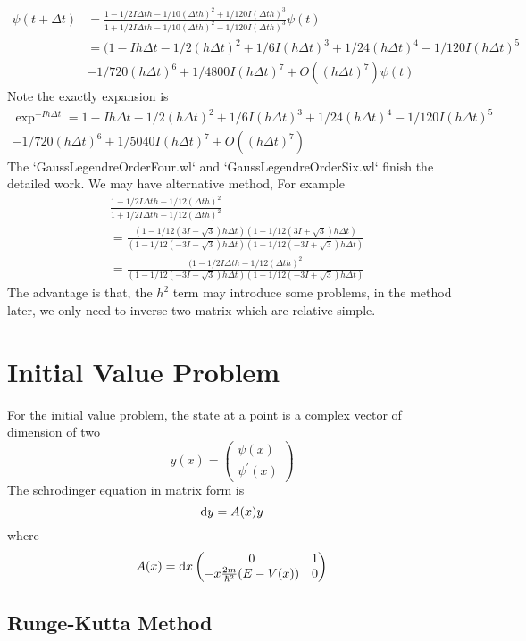 \documentclass[12pt,twoside]{article}
\def\df{{\rm d}}
\begin{document}
\begin{align*}
\psi(t + \Delta t) &= \frac{1 - 1/2 I \Delta t h - 1/10 (\Delta t h)^2 + 1/120 I (\Delta t h)^3}{ 1 + 1/2 I \Delta t h - 1/10 (\Delta t h)^2 - 1/120 I (\Delta t h)^3} \psi(t)\\
&=(1 - I h \Delta t - 1/2 (h \Delta t)^2 + 1/6 I(h \Delta t)^3 + 1/24(h \Delta t)^4 - 1/120I(h \Delta t)^5\\
&-1/720(h \Delta t)^6 + 1/4800I(h \Delta t)^7+ O((h \Delta t)^7)\psi(t)
\end{align*}
Note the exactly expansion is
\begin{multline}
\exp^{-Ih\Delta t} = 1 - I h \Delta t - 1/2 (h \Delta t)^2 + 1/6 I(h \Delta t)^3 + 1/24(h \Delta t)^4 - 1/120I(h \Delta t)^5\\
-1/720(h \Delta t)^6 + 1/5040I(h \Delta t)^7+ O((h \Delta t)^7)
\end{multline}
The `GaussLegendreOrderFour.wl` and  `GaussLegendreOrderSix.wl` finish the detailed work.
We may have alternative method, For example
\begin{align*}
&\frac{1 - 1/2 I \Delta t h - 1/12 (\Delta t h)^2}{ 1 + 1/2 I \Delta t h - 1/12 (\Delta t h)^2}\\
&=\frac{(1-1/12(3I-\sqrt{3})h \Delta t)(1-1/12(3I+\sqrt{3})h \Delta t)}{(1-1/12(-3I-\sqrt{3})h \Delta t)(1-1/12(-3I+\sqrt{3})h \Delta t)}\\
&=\frac{(1 - 1/2 I \Delta t h - 1/12 (\Delta t h)^2}{(1-1/12(-3I-\sqrt{3})h \Delta t)(1-1/12(-3I+\sqrt{3})h \Delta t)}
\end{align*}
The advantage is that, the $h^2$ term may introduce some problems, in the method later, we only need to inverse two matrix which are relative simple.

\section{Initial Value Problem}
For the initial value problem, the state at a point is a complex vector of dimension of two
$$
y(x)=\begin{pmatrix} \psi(x) \\ \psi^\prime(x) \end{pmatrix}
$$
The schrodinger equation in matrix form is
$$
\df y = A(x) y
$$
where
$$
A(x)=\df x\begin{pmatrix}  0 & 1 \\ -x\frac{2m}{\hbar^2}(E-V(x)) & 0 \end{pmatrix}
$$
\subsection{Runge-Kutta Method}
\end{document}
